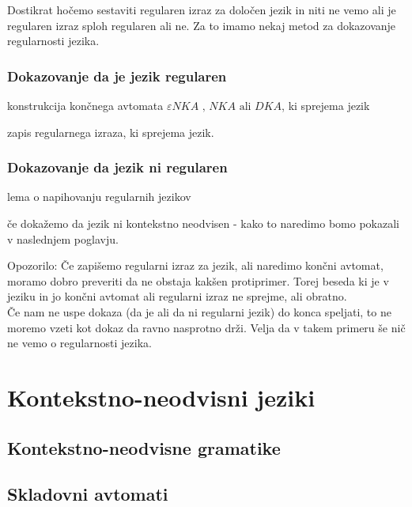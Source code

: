 \documentclass[10pt,a4paper,oneside]{book}
\begin{document}
Dostikrat hočemo sestaviti regularen izraz za določen jezik in niti ne vemo ali je regularen izraz sploh regularen ali ne. Za to imamo nekaj metod za dokazovanje regularnosti jezika.
\subsection*{Dokazovanje da je jezik regularen}
\begin{items}
	\item konstrukcija končnega avtomata $ \varepsilon NKA \mbox{ , } NKA \mbox{ ali } DKA$, ki sprejema jezik
	\item zapis regularnega izraza, ki sprejema jezik.
\end{items}
\subsection*{Dokazovanje da jezik ni regularen}
\begin{items}
	\item lema o napihovanju regularnih jezikov
	\item če dokažemo da jezik ni kontekstno neodvisen - kako to naredimo bomo pokazali v naslednjem poglavju.
\end{items}
Opozorilo: Če zapišemo regularni izraz za jezik, ali naredimo končni avtomat, moramo dobro preveriti da ne obstaja kakšen protiprimer. Torej beseda ki je v jeziku in jo končni avtomat ali regularni izraz ne sprejme, ali obratno.\\
Če nam ne uspe dokaza (da je ali da ni regularni jezik) do konca speljati, to ne moremo vzeti kot dokaz da ravno nasprotno drži. Velja da v takem primeru še nič ne vemo o regularnosti jezika.

\chapter{Kontekstno-neodvisni jeziki}\label{chap:Kontekstno-neodvisni jeziki}
\section{Kontekstno-neodvisne gramatike}
\section{Skladovni avtomati}
\end{document}
